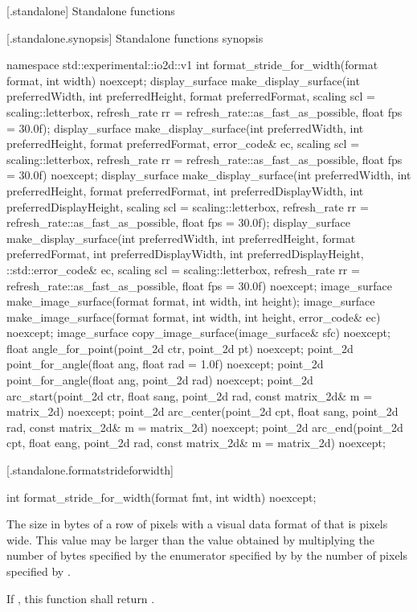  [\iotwod.standalone] {Standalone functions}

 [\iotwod.standalone.synopsis] {Standalone functions synopsis}

\begin{codeblock}
namespace std::experimental::io2d::v1 {
  int format_stride_for_width(format format, int width) noexcept;
  display_surface make_display_surface(int preferredWidth,
    int preferredHeight, format preferredFormat,
    scaling scl = scaling::letterbox,
    refresh_rate rr = refresh_rate::as_fast_as_possible, float fps = 30.0f);
  display_surface make_display_surface(int preferredWidth,
    int preferredHeight, format preferredFormat, error_code& ec,
    scaling scl = scaling::letterbox,
    refresh_rate rr = refresh_rate::as_fast_as_possible, float fps = 30.0f) noexcept;
  display_surface make_display_surface(int preferredWidth,
    int preferredHeight, format preferredFormat, int preferredDisplayWidth, 
    int preferredDisplayHeight, scaling scl = scaling::letterbox,
    refresh_rate rr = refresh_rate::as_fast_as_possible, float fps = 30.0f);
  display_surface make_display_surface(int preferredWidth,
    int preferredHeight, format preferredFormat, int preferredDisplayWidth, 
    int preferredDisplayHeight, ::std::error_code& ec,
    scaling scl = scaling::letterbox,
    refresh_rate rr = refresh_rate::as_fast_as_possible, float fps = 30.0f) noexcept;
  image_surface make_image_surface(format format, int width, int height);
  image_surface make_image_surface(format format, int width, int height, 
    error_code& ec) noexcept;
  image_surface copy_image_surface(image_surface& sfc) noexcept;
  float angle_for_point(point_2d ctr, point_2d pt) noexcept;
  point_2d point_for_angle(float ang, float rad = 1.0f) noexcept;
  point_2d point_for_angle(float ang, point_2d rad) noexcept;
  point_2d arc_start(point_2d ctr, float sang, point_2d rad, 
    const matrix_2d& m = matrix_2d{}) noexcept;
  point_2d arc_center(point_2d cpt, float sang, point_2d rad, 
    const matrix_2d& m = matrix_2d{}) noexcept;
  point_2d arc_end(point_2d cpt, float eang, point_2d rad, 
    const matrix_2d& m = matrix_2d{}) noexcept;
}
\end{codeblock}

 [\iotwod.standalone.formatstrideforwidth] {}

%
\begin{itemdecl}
int format_stride_for_width(format fmt, int width) noexcept;
\end{itemdecl}
\begin{itemdescr}
\pnum
\returns
The size in bytes of a row of pixels with a visual data format of  that is  pixels wide. This value may be larger than the value obtained by multiplying the number of bytes specified by the  enumerator specified by  by the number of pixels specified by .

\pnum
If , this function shall return .
\end{itemdescr}

